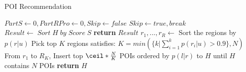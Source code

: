 \begin{algorithm}[th]
\caption{POI Recommendation}
\label{oprec}
\begin{algorithmic}[1]
\State $PartS \leftarrow 0, PartRPro\leftarrow 0, Skip\leftarrow false$
\State $Skip\leftarrow true, break$
\EndIf
\EndWhile
{}
\EndIf
\EndIf
\EndFor
\State $Result\leftarrow\; Sort\; H\; by\; Score\; S$
\State \textbf{return} $Result$
\EndFunction
\Statex
{}
\State $r_1,...,r_R\leftarrow$ Sort the regions by $p(r|u)$
\State Pick top $K$ regions satisfies: $K=min(\{k|\sum_{i=1}^{k}{p(r_i|u)}>0.9\},N)$ %
\State From $r_1$ to $R_K$, Insert top $\ceil*{\frac{N}{K}}$ POIs ordered by $p(l|r)$ to $H$ until $H$ contains $N$ POIs
\State \textbf{return} $H$
\EndFunction
\end{algorithmic}
\end{algorithm}

